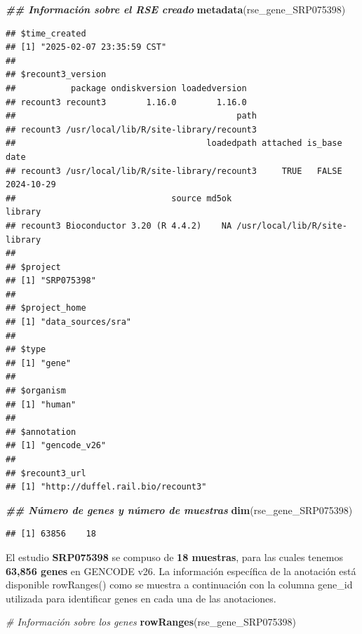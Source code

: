 \documentclass[
]{article}
\newenvironment{Shaded}{\begin{snugshade}}{\end{snugshade}}
\newcommand{\CommentTok}[1]{\textcolor[rgb]{0.56,0.35,0.01}{\textit{#1}}}
\newcommand{\DocumentationTok}[1]{\textcolor[rgb]{0.56,0.35,0.01}{\textbf{\textit{#1}}}}
\newcommand{\FunctionTok}[1]{\textcolor[rgb]{0.13,0.29,0.53}{\textbf{#1}}}
\newcommand{\NormalTok}[1]{#1}
\begin{document}
\begin{Shaded}
\begin{Highlighting}[]
\DocumentationTok{\#\# Información sobre el RSE creado}
\FunctionTok{metadata}\NormalTok{(rse\_gene\_SRP075398)}
\end{Highlighting}
\end{Shaded}

\begin{verbatim}
## $time_created
## [1] "2025-02-07 23:35:59 CST"
## 
## $recount3_version
##           package ondiskversion loadedversion
## recount3 recount3        1.16.0        1.16.0
##                                            path
## recount3 /usr/local/lib/R/site-library/recount3
##                                      loadedpath attached is_base       date
## recount3 /usr/local/lib/R/site-library/recount3     TRUE   FALSE 2024-10-29
##                               source md5ok                       library
## recount3 Bioconductor 3.20 (R 4.4.2)    NA /usr/local/lib/R/site-library
## 
## $project
## [1] "SRP075398"
## 
## $project_home
## [1] "data_sources/sra"
## 
## $type
## [1] "gene"
## 
## $organism
## [1] "human"
## 
## $annotation
## [1] "gencode_v26"
## 
## $recount3_url
## [1] "http://duffel.rail.bio/recount3"
\end{verbatim}

\begin{Shaded}
\begin{Highlighting}[]
\DocumentationTok{\#\# Número de genes y número de muestras}
\FunctionTok{dim}\NormalTok{(rse\_gene\_SRP075398)}
\end{Highlighting}
\end{Shaded}

\begin{verbatim}
## [1] 63856    18
\end{verbatim}

El estudio \textbf{SRP075398} se compuso de \textbf{18 muestras}, para
las cuales tenemos \textbf{63,856 genes} en GENCODE v26. La información
específica de la anotación está disponible rowRanges() como se muestra a
continuación con la columna gene\_id utilizada para identificar genes en
cada una de las anotaciones.

\begin{Shaded}
\begin{Highlighting}[]
\CommentTok{\# Información sobre los genes}
\FunctionTok{rowRanges}\NormalTok{(rse\_gene\_SRP075398)}
\end{Highlighting}
\end{Shaded}
\end{document}
